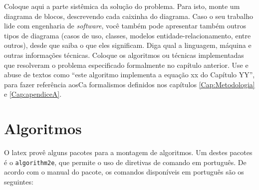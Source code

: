 
\label{Cap:Implementacao}

Coloque aqui a parte sistêmica da solução do problema. Para isto, monte um diagrama de blocos, descrevendo cada caixinha do diagrama. Caso o seu trabalho lide com engenharia de \textit{software}, você também pode apresentar também outros tipos de diagrama (casos de uso, classes, modelos entidade-relacionamento, entre outros), desde que saiba o que eles significam. Diga qual a linguagem, máquina e outras informações técnicas. Coloque os algoritmos ou técnicas implementadas que resolveram o problema especificado formalmente no capítulo anterior. Use e abuse de textos como ``este algoritmo implementa a equação xx do Capítulo YY'', para fazer referência aosCa formalismos definidos nos capítulos \ref{Cap:Metodologia} e \ref{Cap:apendiceA}.

\section{Algoritmos}
\label{Sec:algoritmos}

O latex provê alguns pacotes para a montagem de algoritmos. Um destes pacotes é o \texttt{algorithm2e}, que permite o uso de diretivas de comando em português. De acordo com o manual do pacote, os comandos disponíveis em português são os seguintes:


